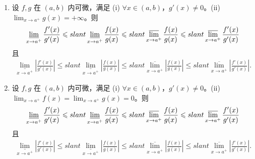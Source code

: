 \documentclass[../../main.tex]{subfiles}
\begin{document}
\begin{theorem}\label{theorem:上下极限L'Hospital法则}
\begin{enumerate}
\item 设 \(f, g\) 在 \((a,b)\) 内可微，满足 (i) \(\forall x \in (a,b)\)，\(g'(x) \ne 0\)。(ii) \(\lim_{x \to a^+} g(x) = +\infty\)。则
\begin{align}
\varliminf_{x \to a^+} \frac{f'(x)}{g'(x)} \leqslant slant \varliminf_{x \to a^+} \frac{f(x)}{g(x)} \leqslant slant \varlimsup_{x \to a^+} \frac{f(x)}{g(x)} \leqslant slant \varlimsup_{x \to a^+} \frac{f'(x)}{g'(x)}\label{theorem4.2-13.27-1}
\end{align}
且
\begin{align}\label{theorem4.2-13.27}
\underset{x\rightarrow a^+}{\underline{\lim }}\left| \frac{f' \left( x \right)}{g' \left( x \right)} \right|\leqslant slant \underset{x\rightarrow a^+}{\underline{\lim }}\left| \frac{f\left( x \right)}{g\left( x \right)} \right|\leqslant slant \underset{x\rightarrow a^+}{\overline{\lim }}\left| \frac{f\left( x \right)}{g\left( x \right)} \right|\leqslant slant \underset{x\rightarrow a^+}{\overline{\lim }}\left| \frac{f' \left( x \right)}{g' \left( x \right)} \right|.
\end{align}


\item 设 \(f, g\) 在 \((a,b)\) 内可微，满足 (i) \(\forall x \in (a,b)\)，\(g'(x) \ne 0\)。(ii) \(\lim_{x \to a^+} f(x) = \lim_{x \to a^+} g(x) = 0\)。则
\begin{align}\label{theorem4.2-13.27-2}
\varliminf_{x \to a^+} \frac{f'(x)}{g'(x)} \leqslant slant \varliminf_{x \to a^+} \frac{f(x)}{g(x)} \leqslant slant \varlimsup_{x \to a^+} \frac{f(x)}{g(x)} \leqslant slant \varlimsup_{x \to a^+} \frac{f'(x)}{g'(x)}
\end{align}
且
\begin{align}\label{theorem4.2-13.281}
\underset{x\rightarrow a^+}{\underline{\lim }}\left| \frac{f' \left( x \right)}{g' \left( x \right)} \right|\leqslant slant \underset{x\rightarrow a^+}{\underline{\lim }}\left| \frac{f\left( x \right)}{g\left( x \right)} \right|\leqslant slant \underset{x\rightarrow a^+}{\overline{\lim }}\left| \frac{f\left( x \right)}{g\left( x \right)} \right|\leqslant slant \underset{x\rightarrow a^+}{\overline{\lim }}\left| \frac{f' \left( x \right)}{g' \left( x \right)} \right|.
\end{align}
\end{enumerate}
\end{theorem}
\end{document}
